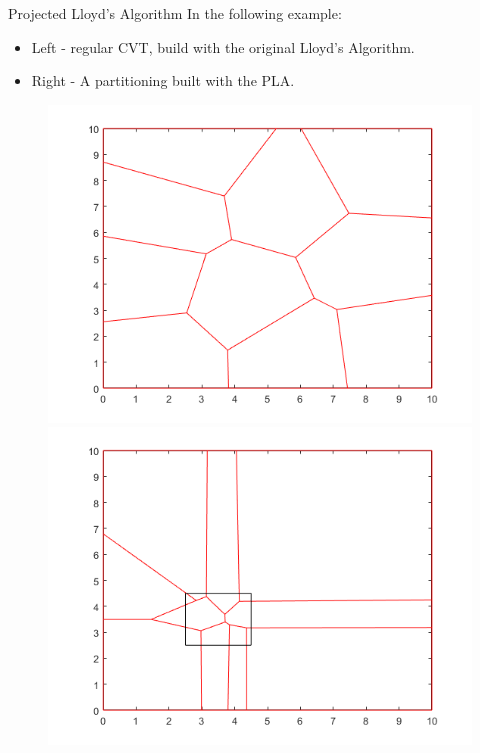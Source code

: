 \documentclass[t]{beamer}
\begin{document}
\begin{frame}[label=projlloydsalgo3]{Projected Lloyd's Algorithm}
In the following example:
\begin{itemize}
\item Left - regular CVT, build with the original Lloyd's Algorithm.
\item Right - A partitioning built with the PLA.
\end{itemize}
\begin{figure}
\centering
\begin{minipage}{.4\textwidth}
  \centering
  \includegraphics[scale=0.3]{proj-lloyds-off.png}
\end{minipage}
\begin{minipage}{.4\textwidth}
  \centering
  \includegraphics[scale=0.3]{proj-lloyds-on.png}
\end{minipage}
\end{figure}

\end{frame}
\end{document}
